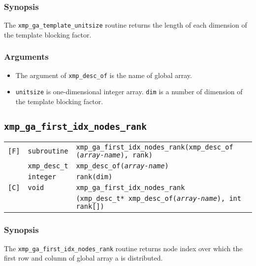 \begin{description}
\begin{tabular}{lll}
\end{tabular}

\subsubsection*{Synopsis}

The {\tt xmp\_ga\_template\_unitsize} routine returns the length of each dimension of 
the template blocking factor.

\subsubsection*{Arguments}

\begin{itemize}
 \item The argument of {\tt xmp\_desc\_of} is the name of global array.
 \item {\tt unitsize} is one-dimensional integer array. {\tt dim} is a number of dimension 
 of the template blocking factor.
\end{itemize}


\subsection{\tt xmp\_ga\_first\_idx\_nodes\_rank}

\begin{tabular}{lll}

\verb![F]!&  {\tt subroutine}& {\tt xmp\_ga\_first\_idx\_nodes\_rank(xmp\_desc\_of
({\it array-name}), rank)}\\
          & {\tt xmp\_desc\_t} & {\tt xmp\_desc\_of({\it array-name})}\\
          & {\tt integer} & {\tt rank(dim)}\\

\verb![C]!&  {\tt void}& {\tt xmp\_ga\_first\_idx\_nodes\_rank}\\
          & & {\tt (xmp\_desc\_t* xmp\_desc\_of({\it array-name}), int rank[])}\\

\end{tabular}

\subsubsection*{Synopsis}

The {\tt xmp\_ga\_first\_idx\_nodes\_rank} routine returns node index over which 
the first row and column of global array a is distributed.


\end{description}
